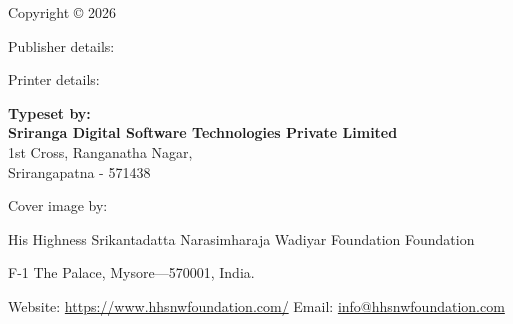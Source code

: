 Copyright © 2026

Publisher details:

Printer details:

{\bf Typeset by:}\\
\textbf{Sriranga Digital Software Technologies Private Limited}\\
1st Cross, Ranganatha Nagar,\\
Srirangapatna - 571438
\vfill

Cover image by:


\vfill

His Highness Srikantadatta Narasimharaja Wadiyar Foundation Foundation\par
F-1 The Palace, Mysore---570001, India.\par
Website: \url{https://www.hhsnwfoundation.com/} Email: \url{info@hhsnwfoundation.com}\par
